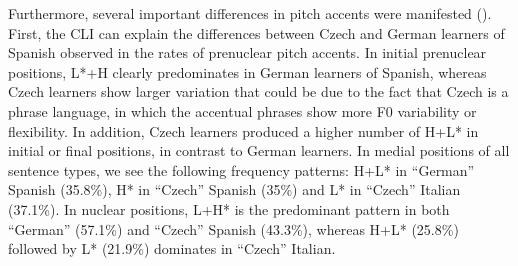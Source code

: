Furthermore, several important differences in pitch accents were manifested (). First, the CLI can explain the differences between Czech and German learners of Spanish observed in the rates of prenuclear pitch accents. In initial prenuclear positions, L*+H clearly predominates in German learners of Spanish, whereas Czech learners show larger variation that could be due to the fact that Czech is a phrase language, in which the accentual phrases show more F0 variability or flexibility. In addition, Czech learners produced a higher number of H+L* in initial or final positions, in contrast to German learners. In medial positions of all sentence types, we see the following frequency patterns: H+L* in “German” Spanish (35.8\%), H* in “Czech” Spanish (35\%) and L* in “Czech” Italian (37.1\%). In nuclear positions, L+H* is the predominant pattern in both “German” (57.1\%) and “Czech” Spanish (43.3\%), whereas H+L* (25.8\%) followed by L* (21.9\%) dominates in “Czech” Italian.


